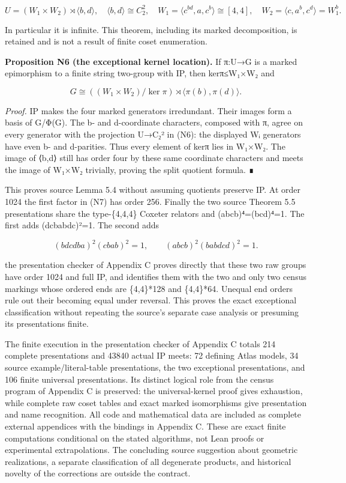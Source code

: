 \documentclass[
  11pt,
  a4paper,
]{article}
\begin{document}
\[
U=(W_1\times W_2)\rtimes\langle b,d\rangle,
\quad \langle b,d\rangle\cong C_2^2,\quad
W_1=\langle c^{bd},a,c^b\rangle\cong[4,4],\quad
W_2=\langle c,a^b,c^d\rangle=W_1^b.
\tag{N6}
\]

In particular it is infinite. This theorem, including its marked
decomposition, is retained and is not a result of finite coset
enumeration.

\textbf{Proposition N6 (the exceptional kernel location).} If π:U→G is a
marked epimorphism to a finite string two-group with IP, then kerπ≤W₁×W₂
and

\[
G\cong ((W_1\times W_2)/\ker\pi)\rtimes\langle\pi(b),\pi(d)\rangle.
\tag{N7}
\]

\emph{Proof.} IP makes the four marked generators irredundant. Their
images form a basis of G/Φ(G). The b- and d-coordinate characters,
composed with π, agree on every generator with the projection U→C₂² in
(N6): the displayed Wᵢ generators have even b- and d-parities. Thus
every element of kerπ lies in W₁×W₂. The image of ⟨b,d⟩ still has order
four by these same coordinate characters and meets the image of W₁×W₂
trivially, proving the split quotient formula. ∎

This proves source Lemma 5.4 without assuming quotients preserve IP. At
order 1024 the first factor in (N7) has order 256. Finally the two
source Theorem 5.5 presentations share the type-\{4,4,4\} Coxeter
relators and (abcb)⁴=(bcd)⁴=1. The first adds (dcbabdc)²=1. The second
adds

\[
(bdcdba)^2(cbab)^2=1,\qquad(abcb)^2(babdcd)^2=1.
\tag{N8}
\]

the presentation checker of Appendix C proves directly that these two
raw groups have order 1024 and full IP, and identifies them with the two
and only two census markings whose ordered ends are \{4,4\}*128 and
\{4,4\}*64. Unequal end orders rule out their becoming equal under
reversal. This proves the exact exceptional classification without
repeating the source's separate case analysis or presuming its
presentations finite.

The finite execution in the presentation checker of Appendix C totals
214 complete presentations and 43840 actual IP meets: 72 defining Atlas
models, 34 source example/literal-table presentations, the two
exceptional presentations, and 106 finite universal presentations. Its
distinct logical role from the census program of Appendix C is
preserved: the universal-kernel proof gives exhaustion, while complete
raw coset tables and exact marked isomorphisms give presentation and
name recognition. All code and mathematical data are included as
complete external appendices with the bindings in Appendix C. These are
exact finite computations conditional on the stated algorithms, not Lean
proofs or experimental extrapolations. The concluding source suggestion
about geometric realizations, a separate classification of all
degenerate products, and historical novelty of the corrections are
outside the contract.
\end{document}
